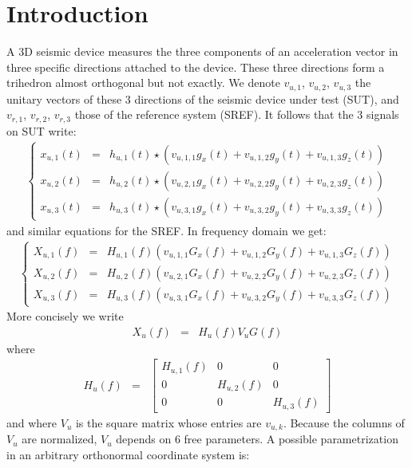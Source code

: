 \documentclass[a4paper, 12pt]{report}
\begin{document}
 \sloppy
\section{Introduction}
A 3D seismic device measures the three components of an acceleration vector in three specific directions attached to the device. These three directions form a trihedron almost orthogonal but not exactly. We denote $v_{u,1}$,  $v_{u,2}$,  $v_{u,3}$ the unitary vectors of these 3 directions of the seismic device under test (SUT), and  $v_{r,1}$,  $v_{r,2}$,  $v_{r,3}$ those of the reference system (SREF). It follows that the 3 signals on SUT write:
\begin{eqnarray*}
\left\{
\begin{array}{rcl}
x_{u,1}(t)&=&h_{u,1}(t)\star (v_{u,1,1}g_{x}(t)+v_{u,1,2}g_{y}(t)+v_{u,1,3}g_{z}(t))
\\
x_{u,2}(t)&=&h_{u,2}(t)\star (v_{u,2,1}g_{x}(t)+v_{u,2,2}g_{y}(t)+v_{u,2,3}g_{z}(t))
\\
x_{u,3}(t)&=&h_{u,3}(t)\star (v_{u,3,1}g_{x}(t)+v_{u,3,2}g_{y}(t)+v_{u,3,3}g_{z}(t))
\end{array}
\right.
\end{eqnarray*}
and similar equations for the SREF. In frequency domain we get:
\begin{eqnarray*}
\left\{
\begin{array}{rcl}
X_{u,1}(f)&=&H_{u,1}(f) (v_{u,1,1}G_{x}(f)+v_{u,1,2}G_{y}(f)+v_{u,1,3}G_{z}(f))
\\
X_{u,2}(f)&=&H_{u,2}(f) (v_{u,2,1}G_{x}(f)+v_{u,2,2}G_{y}(f)+v_{u,2,3}G_{z}(f))
\\
X_{u,3}(f)&=&H_{u,3}(f) (v_{u,3,1}G_{x}(f)+v_{u,3,2}G_{y}(f)+v_{u,3,3}G_{z}(f))
\end{array}
\right.
\end{eqnarray*}
More concisely we write
\begin{eqnarray*}
X_{u}(f)&=&H_{u}(f)V_{u}G(f)
\end{eqnarray*}
where 
\begin{eqnarray*}
H_{u}(f)&=&
\begin{bmatrix}
H_{u,1}(f)&0&0
\\
0&H_{u,2}(f)&0
\\
0&0&H_{u,3}(f)
\end{bmatrix}
\end{eqnarray*}
and where $V_{u}$ is the square matrix whose entries are $v_{u,k}$. Because the columns of $V_{u}$ are normalized, $V_{u}$ depends on 6 free parameters. A possible parametrization in an arbitrary orthonormal coordinate system is:
\end{document}
